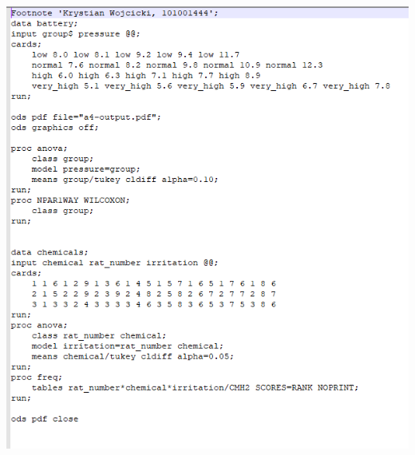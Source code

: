 \documentclass{article}
\begin{document}
\begin{center}
\includegraphics[scale=.9]{a4_sascode}
\end{center}
\end{document}
